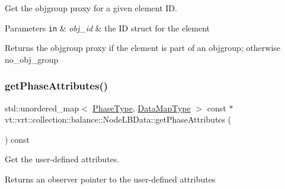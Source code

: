 Get the objgroup proxy for a given element ID. 


\begin{DoxyParams}[1]{Parameters}
\mbox{\tt in}  & {\em obj\+\_\+id} & the ID struct for the element\\
\hline
\end{DoxyParams}
\begin{DoxyReturn}{Returns}
the objgroup proxy if the element is part of an objgroup; otherwise {\ttfamily no\+\_\+obj\+\_\+group} 
\end{DoxyReturn}
\mbox{\label{structvt_1_1vrt_1_1collection_1_1balance_1_1_node_l_b_data_a3210dba00d8bc4220c2493f2091d4990}} 
\subsubsection{\texorpdfstring{get\+Phase\+Attributes()}{getPhaseAttributes()}}
{\footnotesize\ttfamily std\+::unordered\+\_\+map$<$ \hyperlink{namespacevt_a46ce6733d5cdbd735d561b7b4029f6d7}{Phase\+Type}, \hyperlink{namespacevt_1_1vrt_1_1collection_1_1balance_acf152c668ed9e2e9c6b29784181d2435}{Data\+Map\+Type} $>$ const  $\ast$ vt\+::vrt\+::collection\+::balance\+::\+Node\+L\+B\+Data\+::get\+Phase\+Attributes (\begin{DoxyParamCaption}{ }\end{DoxyParamCaption}) const}



Get the user-\/defined attributes. 

\begin{DoxyReturn}{Returns}
an observer pointer to the user-\/defined attributes 
\end{DoxyReturn}
\mbox{\label{structvt_1_1vrt_1_1collection_1_1balance_1_1_node_l_b_data_a73b93e4e239cc32982d5474fca1f7b64}} 
